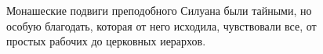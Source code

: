 \documentclass[12pt,a4paper]{article}
\begin{document}
\begin{figure}[h]
\begin{minipage}[b]{\secondcolumnwidth}
Монашеские подвиги преподобного Силуана были тайными, но особую благодать, которая от него исходила, чувствовали все, от простых рабочих до церковных иерархов. 
\vspace{40pt}
\end{minipage}

\end{figure}


\end{document}

